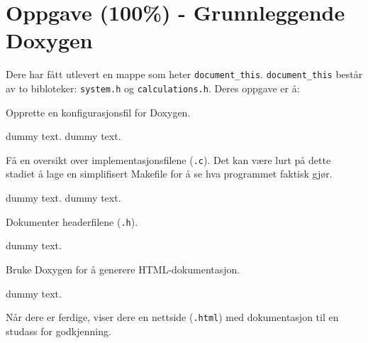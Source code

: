 \section{Oppgave (100\%) - Grunnleggende Doxygen}\label{sec:3-oppgave}

Dere har fått utlevert en mappe som heter \verb|document_this|. \verb|document_this| består av to bibloteker: \verb|system.h| og \verb|calculations.h|. Deres oppgave er å:

\begin{subprob}
    Opprette en konfigurasjonsfil for Doxygen.
	\begin{solution}
	    dummy text. dummy text. 
	\end{solution}
\end{subprob}

\begin{subprob}
    Få en oversikt over implementasjonsfilene (\verb|.c|). Det kan være lurt på dette stadiet å lage en simplifisert Makefile for å se hva programmet faktisk gjør.	\begin{solution}
        dummy text. dummy text. 
	\end{solution}
\end{subprob}

\begin{subprob}
    Dokumenter headerfilene (\verb|.h|).
	\begin{solution}
	    dummy text. 
	\end{solution}
\end{subprob}

\begin{subprob}
    Bruke Doxygen for å generere HTML-dokumentasjon.
	\begin{solution}
	    dummy text. 
	\end{solution}
\end{subprob}




Når dere er ferdige, viser dere en nettside (\verb|.html|) med dokumentasjon til en studass for godkjenning.